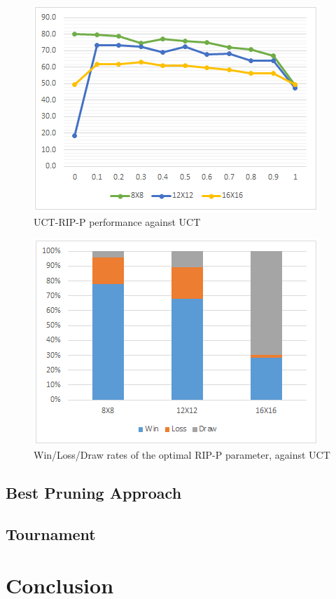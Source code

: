 \documentclass[conference]{IEEEtran}
\begin{document}
\begin{figure}[!h]
\begin{center}
	\includegraphics[scale=0.7]{figs/PT-UCT-RIP-P.png}
	\caption{UCT-RIP-P performance against UCT}
	\label{PT-UCT-RIP-P}
\end{center}
\end{figure}

\begin{figure}[!h]
\begin{center}
	\includegraphics[scale=0.7]{figs/WLDRate-UCT-RIP-P.png}
	\caption{Win/Loss/Draw rates of the optimal RIP-P parameter, against UCT }
	\label{PT-UCT-RIP-F}
\end{center}
\end{figure}

\subsection{Best Pruning Approach}

\subsection{Tournament}

\section{Conclusion}



\end{document}
